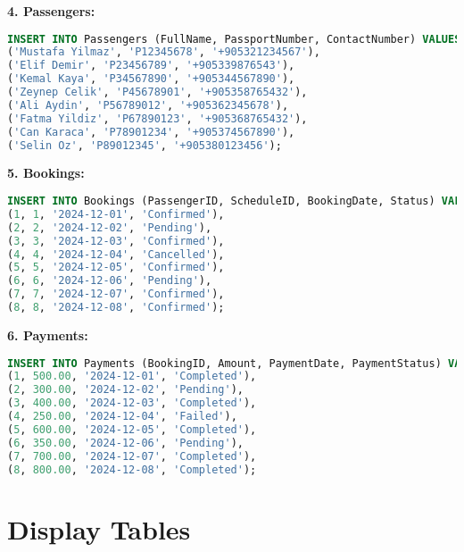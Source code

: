 \documentclass[14pt,a4paper]{extarticle}
\begin{document}
\textbf{4. Passengers:}
\begin{lstlisting}[language=SQL, upquote=true]
INSERT INTO Passengers (FullName, PassportNumber, ContactNumber) VALUES
('Mustafa Yilmaz', 'P12345678', '+905321234567'),
('Elif Demir', 'P23456789', '+905339876543'),
('Kemal Kaya', 'P34567890', '+905344567890'),
('Zeynep Celik', 'P45678901', '+905358765432'),
('Ali Aydin', 'P56789012', '+905362345678'),
('Fatma Yildiz', 'P67890123', '+905368765432'),
('Can Karaca', 'P78901234', '+905374567890'),
('Selin Oz', 'P89012345', '+905380123456');
\end{lstlisting}

\textbf{5. Bookings:}
\begin{lstlisting}[language=SQL, upquote=true]
INSERT INTO Bookings (PassengerID, ScheduleID, BookingDate, Status) VALUES
(1, 1, '2024-12-01', 'Confirmed'),
(2, 2, '2024-12-02', 'Pending'),
(3, 3, '2024-12-03', 'Confirmed'),
(4, 4, '2024-12-04', 'Cancelled'),
(5, 5, '2024-12-05', 'Confirmed'),
(6, 6, '2024-12-06', 'Pending'),
(7, 7, '2024-12-07', 'Confirmed'),
(8, 8, '2024-12-08', 'Confirmed');
\end{lstlisting}

\textbf{6. Payments:}
\begin{lstlisting}[language=SQL, upquote=true]
INSERT INTO Payments (BookingID, Amount, PaymentDate, PaymentStatus) VALUES
(1, 500.00, '2024-12-01', 'Completed'),
(2, 300.00, '2024-12-02', 'Pending'),
(3, 400.00, '2024-12-03', 'Completed'),
(4, 250.00, '2024-12-04', 'Failed'),
(5, 600.00, '2024-12-05', 'Completed'),
(6, 350.00, '2024-12-06', 'Pending'),
(7, 700.00, '2024-12-07', 'Completed'),
(8, 800.00, '2024-12-08', 'Completed');
\end{lstlisting}

\newpage

\section{Display Tables}
\end{document}
